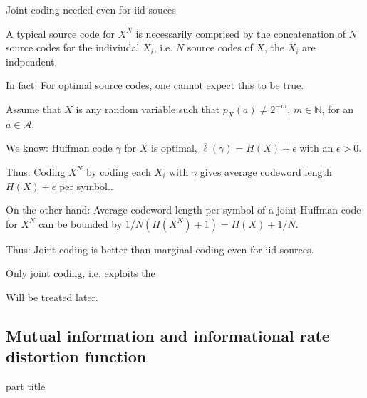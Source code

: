 \begin{frame}{Joint coding needed even for iid souces} 
\bit
\item A typical source code for $X^N$ is  necessarily comprised by the concatenation of $N$ 
source codes for the indiviudal $X_i$, i.e. $N$ source codes of $X$,  the $X_i$ are indpendent.
\item In fact:  For optimal source codes, one cannot expect this to be true. 
\eit
\vspace{-3.5mm}
\bit
\item  Assume that $X$ is any random variable such that $p_X(a)\neq 2^{-m}$, $m\in\mathbb{N}$, for an $a\in\mathcal{A}$. 
\item We know: Huffman code $\gamma$ for $X$ is optimal, 
$\overline{\ell}(\gamma)=H(X)+\epsilon$ with an $\epsilon>0$.
\item Thus: Coding $X^N$ by coding each $X_i$ with $\gamma$  gives average codeword length $H(X)+\epsilon$ per symbol..    
\item On the other hand: Average codeword length per symbol of a joint  Huffman code for $X^N$
can be bounded by $1/N(H(X^N)+1)=H(X)+1/N$. 
\item[\iarrow] Thus: Joint coding is better than marginal coding even for iid sources. 
\eit
\vspace{-2.5mm}
\bit
\item Only joint coding, i.e.  exploits the 
\item Will be treated later. 
\eit
\end{frame}

\subsection{Mutual information and informational rate distortion function}
\begin{frame}
 \vspace{12.0ex}
\begin{center}
\begin{beamercolorbox}[sep=12pt,center]{part title}
\insertsubsection\par
\end{beamercolorbox}
\end{center}
\end{frame}

